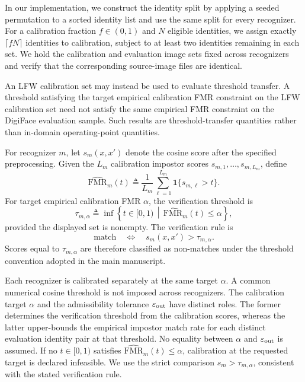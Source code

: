 \documentclass[journal]{IEEEtran}
\begin{document}
\begin{bibunit}
In our implementation, we construct the identity split by applying a seeded permutation to a sorted identity list and use the same split for every recognizer. For a calibration fraction $f\in(0,1)$ and $N$ eligible identities, we assign exactly $\lceil fN\rceil$ identities to calibration, subject to at least two identities remaining in each set. We hold the calibration and evaluation image sets fixed across recognizers and verify that the corresponding source-image files are identical.

An LFW calibration set may instead be used to evaluate threshold transfer. A threshold satisfying the target empirical calibration FMR constraint on the LFW calibration set need not satisfy the same empirical FMR constraint on the DigiFace evaluation sample. Such results are threshold-transfer quantities rather than in-domain operating-point quantities.

For recognizer $m$, let $s_m(x,x')$ denote the cosine score after the specified preprocessing. Given the $L_m$ calibration impostor scores $s_{m,1},\ldots,s_{m,L_m}$, define
%
\begin{equation}
\widehat{\mathrm{FMR}}_m(t) \triangleq
\frac{1}{L_m} \sum_{\ell=1}^{L_m} \mathbf 1\{s_{m,\ell}>t\}.
\label{eq:supp_empirical_calibration_fmr}
\end{equation}
%
For target empirical calibration FMR $\alpha$, the verification threshold is
%
\begin{equation}
\tau_{m,\alpha} \triangleq \inf \left\{ t\in[0,1) \,\middle|\,
\widehat{\mathrm{FMR}}_m(t)\le\alpha \right\},
\label{eq:supp_empirical_threshold_rule}
\end{equation}
%
provided the displayed set is nonempty. The verification rule is
%
\begin{equation}
\text{match}
\quad\Longleftrightarrow\quad s_m(x,x')>\tau_{m,\alpha}.
\end{equation}
%
Scores equal to $\tau_{m,\alpha}$ are therefore classified as non-matches under the threshold convention adopted in the main manuscript.



Each recognizer is calibrated separately at the same target $\alpha$. A common numerical cosine threshold is not imposed across recognizers. The calibration target $\alpha$ and the admissibility tolerance $\varepsilon_{\rm out}$ have distinct roles. The former determines the verification threshold from the calibration scores, whereas the latter upper-bounds the empirical impostor match rate for each distinct
evaluation identity pair at that threshold. No equality between $\alpha$ and $\varepsilon_{\rm out}$ is assumed.
%
If no $t\in[0,1)$ satisfies $\widehat{\mathrm{FMR}}_m(t)\le\alpha$, calibration at the requested target is declared infeasible. We use the strict comparison $s_m>\tau_{m,\alpha}$, consistent with the stated verification rule.


\end{bibunit}
\end{document}
